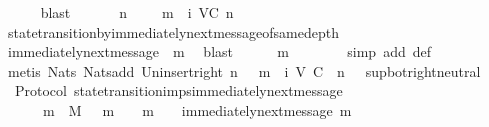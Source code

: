 \begin{isabellebody}
\ \ \ \ \isamarkupfalse%
\ blast\isanewline
\ \ \isamarkupfalse%
\ \isamarkupfalse%
\ {\isachardoublequoteopen}{\isasymexists}\ n\ {\isasymin}\ {\isasymnat}{\isachardot}\ {\isasymsigma}\ {\isasymunion}\ {\isacharbraceleft}m{\isacharbraceright}\ {\isasymin}\ {\isasymSigma}i\ {\isacharparenleft}V{\isacharcomma}C{\isacharcomma}{\isasymepsilon}{\isacharparenright}\ {\isacharparenleft}n\ {\isacharplus}\ {}{\isacharparenright}{\isachardoublequoteclose}\isanewline
\ \ \ \ \isamarkupfalse%
\ state{\isacharunderscore}transition{\isacharunderscore}by{\isacharunderscore}immediately{\isacharunderscore}next{\isacharunderscore}message{\isacharunderscore}of{\isacharunderscore}same{\isacharunderscore}depth\isanewline
\ \ \ \ \isamarkupfalse%
\ {\isacartoucheopen}immediately{\isacharunderscore}next{\isacharunderscore}message\ {\isacharparenleft}{\isasymsigma}{\isacharcomma}\ m{\isacharparenright}{\isacartoucheclose}\ \isamarkupfalse%
\ blast\isanewline
\ \ \isamarkupfalse%
\ {\isachardoublequoteopen}{\isasymsigma}\ {\isasymunion}\ {\isacharbraceleft}m{\isacharbraceright}\ {\isasymin}\ {\isasymSigma}{\isachardoublequoteclose}\isanewline
\ \ \ \ \isamarkupfalse%
\ {\isacharparenleft}simp\ add{\isacharcolon}\ {\isasymSigma}{\isacharunderscore}def{\isacharparenright}\isanewline
\ \ \ \ \isamarkupfalse%
\ {\isacharparenleft}metis\ Nats{\isacharunderscore}{}\ Nats{\isacharunderscore}add\ Un{\isacharunderscore}insert{\isacharunderscore}right\ {\isacartoucheopen}{\isasymexists}n{\isasymin}{\isasymnat}{\isachardot}\ {\isasymsigma}\ {\isasymunion}\ {\isacharbraceleft}m{\isacharbraceright}\ {\isasymin}\ {\isasymSigma}i\ {\isacharparenleft}V{\isacharcomma}\ C{\isacharcomma}\ {\isasymepsilon}{\isacharparenright}\ {\isacharparenleft}n\ {\isacharplus}\ {}{\isacharparenright}{\isacartoucheclose}\ sup{\isacharunderscore}bot{\isachardot}right{\isacharunderscore}neutral{\isacharparenright}\isanewline
{}\isamarkupfalse%
%
\endisatagproof
{\isafoldproof}%
%
\isadelimproof
\isanewline
%
\endisadelimproof
\isanewline
{}\isamarkupfalse%
\ {\isacharparenleft}\ Protocol{\isacharparenright}\ state{\isacharunderscore}transition{\isacharunderscore}imps{\isacharunderscore}immediately{\isacharunderscore}next{\isacharunderscore}message{\isacharcolon}\ \isanewline
\ \ {\isachardoublequoteopen}{\isasymforall}\ {\isasymsigma}\ {\isasymin}{\isasymSigma}{\isachardot}\ {\isasymforall}\ m\ {\isasymin}\ M{\isachardot}\ {\isasymsigma}\ {\isasymunion}\ {\isacharbraceleft}m{\isacharbraceright}\ {\isasymin}\ {\isasymSigma}\ {\isasymand}\ m\ {\isasymnotin}\ {\isasymsigma}\ {\isasymlongrightarrow}\ immediately{\isacharunderscore}next{\isacharunderscore}message\ {\isacharparenleft}{\isasymsigma}{\isacharcomma}m{\isacharparenright}{\isachardoublequoteclose}\isanewline

\end{isabellebody}
